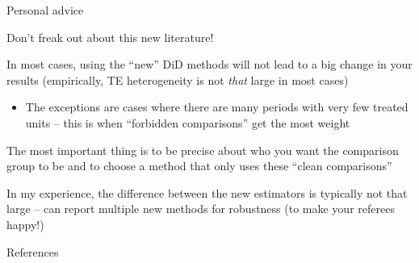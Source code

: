 \documentclass[aspectratio = 169, 13pt]{beamer}
\begin{document}
\begin{frame}{Personal advice}
  \begin{wideitemize}
    \item
    Don't freak out about this new literature!

    \pause
    \item
    In most cases, using the ``new'' DiD methods will not lead to a big change in your results (empirically, TE heterogeneity is not \textit{that} large in most cases)
    \begin{itemize}
      \item
            The exceptions are cases where there are many periods with very few treated units -- this is when ``forbidden comparisons'' get the most weight
    \end{itemize}

    \pause
    \item
    The most important thing is to be precise about who you want the comparison group to be and to choose a method that only uses these ``clean comparisons''

    \pause
    \item
    In my experience, the difference between the new estimators is typically not that large -- can report multiple new methods for robustness (to make your referees happy!)
  \end{wideitemize}
\end{frame}






\backupbegin
\begin{frame}[allowframebreaks]{References}
  
\end{frame}
\backupend
\end{document}
